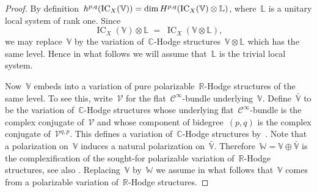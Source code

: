 \documentclass[a4paper]{amsart}
\newcommand{\bbC}{\mathbb{C}}
\newcommand{\bbL}{\mathbb{L}}
\newcommand{\bbR}{\mathbb{R}}
\newcommand{\bbV}{\mathbb{V}}
\newcommand{\bbW}{\mathbb{W}}
\newcommand{\cC}{\mathcal{C}}
\newcommand{\cV}{\mathcal{V}}
\newcommand{\rH}{\textup{H}}
\DeclareMathOperator{\IC}{IC}
\theoremstyle{plain}
\theoremstyle{definition}
\numberwithin{equation}{section}
\begin{document}
\begin{proof} 
By definition~$h^{p,q}(\IC_X(\bbV))=\dim \rH^{p,q}(\IC_X(\bbV)\otimes \bbL)$, where~$\bbL$ is a unitary local system of rank one. Since
%
\[
 \IC_X(\bbV) \otimes \bbL \;=\; \IC_X(\bbV \otimes \bbL),
\]
%
we may replace~$\bbV$ by the variation of~$\bbC$-Hodge structures~$\bbV \otimes \bbL$ which has the same level. Hence in what follows we will assume that~$\bbL$ is the trivial local system.\medskip

Now~$\bbV$ embeds into a variation of pure polarizable~$\bbR$-Hodge structures of the same level. To see this, write~$\cV$ for the flat~$\cC^\infty$-bundle underlying~$\bbV$. Define~$\bar{\bbV}$ to be the variation of~$\bbC$-Hodge structures whose underlying flat~$\cC^\infty$-bundle is the complex conjugate of~$\cV$ and whose component of bidegree~$(p,q)$ is the complex conjugate of~$\cV^{q,p}$.  This defines a variation of~$\bbC$-Hodge structures by~\cite[sect.~4.1.a]{MHMProject}. Note that a polarization on~$\bbV$ induces a natural polarization on~$\bar{\bbV}$. Therefore~$\bbW = \bbV \oplus \bar{\bbV}$ is the complexification of the  sought-for polarizable variation of~$\bbR$-Hodge structures, see also \cite[rem. 4.1.12]{MHMProject}.
Replacing~$\bbV$ by~$\bbW$ we assume in what follows that~$\bbV$ comes from a polarizable variation of~$\bbR$-Hodge structures.
\medskip 


\end{proof}
\end{document}

